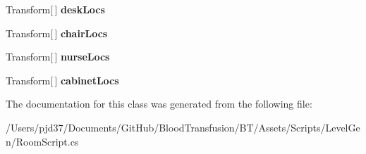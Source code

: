 \begin{DoxyCompactItemize}
\item 
Transform\mbox{[}$\,$\mbox{]} {\bfseries desk\+Locs}\hypertarget{class_room_script_a20b0d5e31deacdcf29a5dfb42226d3a0}{}\label{class_room_script_a20b0d5e31deacdcf29a5dfb42226d3a0}

\item 
Transform\mbox{[}$\,$\mbox{]} {\bfseries chair\+Locs}\hypertarget{class_room_script_a546d3060e19fb8e9a88bbb9d70f87a2b}{}\label{class_room_script_a546d3060e19fb8e9a88bbb9d70f87a2b}

\item 
Transform\mbox{[}$\,$\mbox{]} {\bfseries nurse\+Locs}\hypertarget{class_room_script_a28d7615eac02597e158e042b40eb0983}{}\label{class_room_script_a28d7615eac02597e158e042b40eb0983}

\item 
Transform\mbox{[}$\,$\mbox{]} {\bfseries cabinet\+Locs}\hypertarget{class_room_script_a423c3b1e9b93606bf8421b360f903784}{}\label{class_room_script_a423c3b1e9b93606bf8421b360f903784}

\end{DoxyCompactItemize}


The documentation for this class was generated from the following file\+:\begin{DoxyCompactItemize}
\item 
/\+Users/pjd37/\+Documents/\+Git\+Hub/\+Blood\+Transfusion/\+B\+T/\+Assets/\+Scripts/\+Level\+Gen/Room\+Script.\+cs\end{DoxyCompactItemize}
